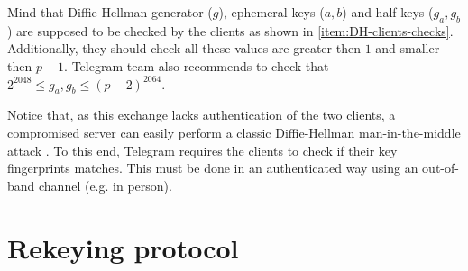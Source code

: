 Mind that Diffie-Hellman generator ($g$), ephemeral keys ($a, b$) and half keys ($g_a, g_b$) are supposed to be checked by the clients as shown in \cref{item:DH-clients-checks}. Additionally, they should check all these values are greater then $1$ and smaller then $p-1$. Telegram team also recommends to check that $2^{2048}\leq g_a, g_b \leq \left(p-2\right)^{2064}$.

Notice that, as this exchange lacks authentication of the two clients, a compromised server can easily perform a classic Diffie-Hellman man-in-the-middle attack \cite{DH-MITM}. To this end, Telegram requires the clients to check if their key fingerprints matches. This must be done in an authenticated way using an out-of-band channel (e.g. in person).

\section{Rekeying protocol}
\label{sec:rekeying}